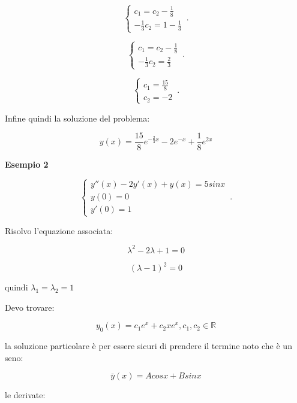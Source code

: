 \documentclass[../appunti-analisi.tex]{subfiles}
\begin{document}
    \begin{equation}
        \begin{cases}
            c_1=c_2-\frac{1}{8}\\
            -\frac{1}{3}c_2= 1- \frac{1}{3}
        \end{cases}\,.
    \end{equation}

    \begin{equation}
        \begin{cases}
            c_1=c_2-\frac{1}{8}\\
            -\frac{1}{3}c_2=\frac{2}{3}
        \end{cases}\,.
    \end{equation}

    \begin{equation}
        \begin{cases}
            c_1=\frac{15}{8}\\
            c_2=-2
        \end{cases}\,.
    \end{equation}


Infine quindi la soluzione del problema:

\[
    y(x) = \frac{15}{8}e ^{-\frac{2}{3}x}- 2 e ^{-x}+ \frac{1}{8}e ^{2x}
\]


\textbf{Esempio 2} 

    \begin{equation}
        \begin{cases}
    y''(x) -2y'(x)+ y(x) = 5sinx \\
            y(0) = 0\\
            y'(0) = 1
        \end{cases}\,.
    \end{equation}


Risolvo l'equazione associata:

\[
    \lambda^{2}-2 \lambda + 1=0
\]

\[
    (\lambda-1)^{2}=0
\]

quindi $\lambda_1=\lambda_2=1$


Devo trovare:

\[
    y_0(x) = c_1 e ^{x} + c_2 x e ^{x},c_1,c_2 \in \mathbb{R}
\]

la soluzione particolare è per essere sicuri di prendere il termine noto che è un seno:

\[
    \bar{y} (x) = A cosx + B sinx
\]

le derivate:
\end{document}
